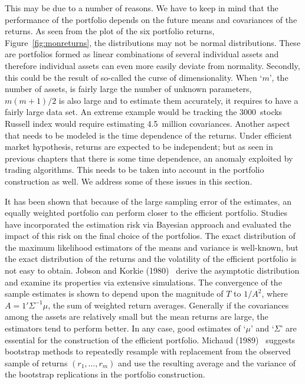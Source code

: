 This may be due to a number of reasons. We have to keep in mind that the performance of the portfolio depends on the future means and covariances of the returns. As seen from the plot of the six portfolio returns, Figure~\ref{fig:monreturns}, the distributions may not be normal distributions. These are portfolios formed as linear combinations of several individual assets and therefore individual assets can even more easily deviate from normality. Secondly, this could be the result of so-called the curse of dimensionality. When `$m$', the number of assets, is fairly large the number of unknown parameters, $m(m+1)/2$ is also large and to estimate them accurately, it requires to have a fairly large data set. An extreme example would be tracking the 3000~stocks Russell index would require estimating 4.5~million covariances. Another aspect that needs to be modeled is the time dependence of the returns. Under efficient market hypothesis, returns are expected to be independent; but as seen in previous chapters that there is some time dependence, an anomaly exploited by trading algorithms. This needs to be taken into account in the portfolio construction as well. We address some of these issues in this section. 


It has been shown that because of the large sampling error of the estimates, an equally weighted portfolio can perform closer to the efficient portfolio. Studies have incorporated the estimation risk via Bayesian approach and evaluated the impact of this risk on the final choice of the portfolios. The exact distribution of the maximum likelihood estimators of the means and variance is well-known, but the exact distribution of the returns and the volatility of the efficient portfolio is not easy to obtain. Jobson and Korkie (1980)~\cite{jobkor} derive the asymptotic distribution and examine its properties via extensive simulations. The convergence of the sample estimates is shown to depend upon the magnitude of $T$ to $1/A^2$, where $A=1' \Sigma^{-1}\mu$, the sum of weighted return averages. Generally if the covariances among the assets are relatively small but the mean returns are large, the estimators tend to perform better. In any case, good estimates of `$\mu$' and `$\Sigma$' are essential for the construction of the efficient portfolio. Michaud (1989)~\cite{michaud} suggests bootstrap methods to repeatedly resample with replacement from the observed sample of returns $(r_1, \ldots, r_m)$ and use the resulting average and the variance of the bootstrap replications in the portfolio construction. \twomedskip


